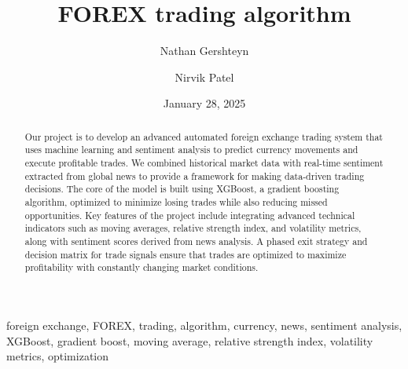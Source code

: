 ﻿\documentclass[12pt,conference,onecolumn]{IEEEtran}
\title{FOREX trading algorithm}
\author{Nathan Gershteyn \and Nirvik Patel}
\date{January 28, 2025}
\begin{document}
\maketitle 

\begin{abstract}
Our project is to develop an advanced automated foreign exchange trading system that uses machine learning and sentiment analysis to predict currency movements and execute profitable trades. We combined historical market data with real-time sentiment extracted from global news to provide a framework for making data-driven trading decisions. The core of the model is built using XGBoost, a gradient boosting algorithm, optimized to minimize losing trades while also reducing missed opportunities. Key features of the project include integrating advanced technical indicators such as moving averages, relative strength index, and volatility metrics, along with sentiment scores derived from news analysis. A phased exit strategy and decision matrix for trade signals ensure that trades are optimized to maximize profitability with constantly changing market conditions.
\end{abstract}

\begin{IEEEkeywords}
foreign exchange, FOREX, trading, algorithm, currency, news, sentiment analysis, XGBoost, gradient boost, moving average, relative strength index, volatility metrics, optimization
\end{IEEEkeywords}
\end{document}

